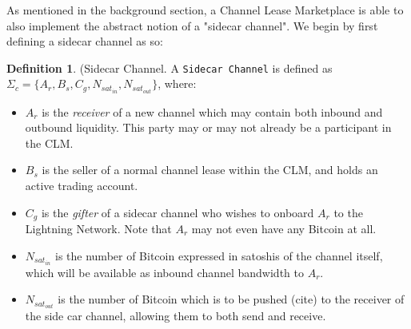 \documentclass[10pt,a4paper]{article}
\theoremstyle{definition}
\newtheorem{definition}{Definition}[section]
\begin{document}
As mentioned in the background section, a Channel Lease Marketplace is able to
also implement the abstract notion of a "sidecar channel". We begin by first
defining a sidecar channel as so:

\theoremstyle{definition}

\begin{definition}{(Sidecar Channel.} 
    A \texttt{Sidecar Channel} is defined as $\Sigma_c = \{A_{r}, B_{s}, C_{g},
    N_{sat_{in}}, N_{sat_{out}}\}$, where:
\end{definition}
\begin{itemize}
    \item $A_{r}$ is the \emph{receiver} of a new channel which may contain both
        inbound and outbound liquidity. This party may or may not already be a
        participant in the CLM.

    \item $B_{s}$ is the seller of a normal channel lease within the CLM, and
        holds an active trading account.

    \item $C_{g}$ is the \emph{gifter} of a sidecar channel who wishes to onboard
        $A_{r}$ to the Lightning Network. Note that $A_{r}$ may not even have any
        Bitcoin at all.

    \item $N_{sat_{in}}$ is the number of Bitcoin expressed in satoshis of the
        channel itself, which will be available as inbound channel bandwidth to
        $A_{r}$.

    \item $N_{sat_{out}}$ is the number of Bitcoin which is to be pushed (cite)
        to the receiver of the side car channel, allowing them to both send and
        receive.
\end{itemize}
\end{document}

